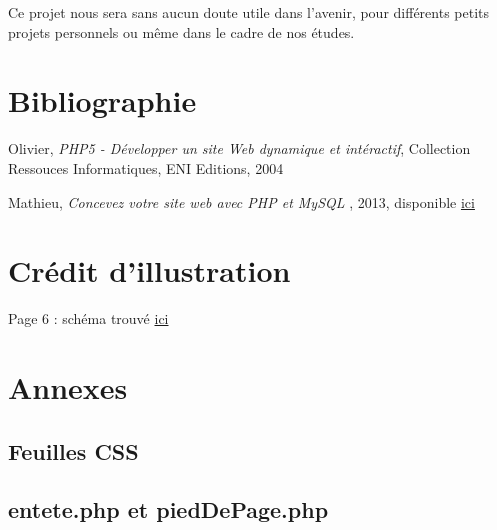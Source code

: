\documentclass{article}
\begin{document}
\bigskip
Ce projet nous sera sans aucun doute utile dans l'avenir, pour différents petits projets personnels ou même dans le cadre de nos études.

\newpage
\appendix
\section{Bibliographie}
 Olivier, \textit{PHP5 - Développer un site Web dynamique et intéractif}, Collection Ressouces Informatiques, ENI Editions, 2004

\bigskip
{} Mathieu, \textit{Concevez votre site web avec PHP et MySQL }, 2013, disponible \href{http://www.siteduzero.com/informatique/tutoriels/concevez-votre-site-web-avec-php-et-mysql}{ici}

\bigskip
\section{Crédit d'illustration}
Page 6 : schéma trouvé \href{http://www.phpdebutant.org/system/images/intro/schema2.gif}{ici}

\newpage
\section{Annexes}
\subsection{Feuilles CSS}



\subsection{entete.php et piedDePage.php}



\end{document}
